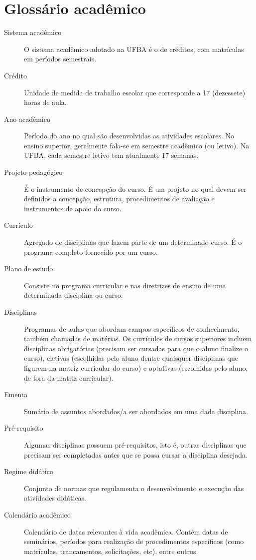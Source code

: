 \chapter{Glossário acadêmico}

\begin{description}
\item[Sistema acadêmico] O sistema acadêmico adotado na UFBA é o de créditos, com matrículas em períodos semestrais.
\item[Crédito] Unidade de medida de trabalho escolar que corresponde a 17 (dezessete) horas de aula.
\item[Ano acadêmico] Período do ano no qual são desenvolvidas as atividades escolares. No ensino superior, geralmente fala-se em semestre acadêmico (ou letivo). Na UFBA, cada semestre letivo tem atualmente 17 semanas.
\item[Projeto pedagógico] É o instrumento de concepção do curso. É um projeto no qual devem ser definidos a concepção, estrutura, procedimentos de avaliação e instrumentos de apoio do curso.
\item[Currículo] Agregado de disciplinas que fazem parte de um determinado curso. É o programa completo fornecido por um curso.
\item[Plano de estudo] Consiste no programa curricular e nas diretrizes de ensino de uma determinada disciplina ou curso.
\item[Disciplinas] Programas de aulas que abordam campos específicos de conhecimento, também chamadas de matérias. Os currículos de cursos superiores incluem disciplinas obrigatórias (precisam ser cursadas para que o aluno finalize o curso), eletivas (escolhidas pelo aluno dentre quaisquer disciplinas que figurem na matriz curricular do curso) e optativas (escolhidas pelo aluno, de fora da matriz curricular).
\item[Ementa] Sumário de assuntos abordados/a ser abordados em uma dada disciplina.
\item[Pré-requisito] Algumas disciplinas possuem pré-requisitos, isto é, outras disciplinas que precisam ser completadas antes que se possa cursar a disciplina desejada. 
\item[Regime didático] Conjunto de normas que regulamenta o desenvolvimento e execução das atividades didáticas.
\item[Calendário acadêmico] Calendário de datas relevantes à vida acadêmica. Contém datas de seminários, períodos para realização de procedimentos específicos (como matrículas, trancamentos, solicitações, etc), entre outros.

\end{description}
